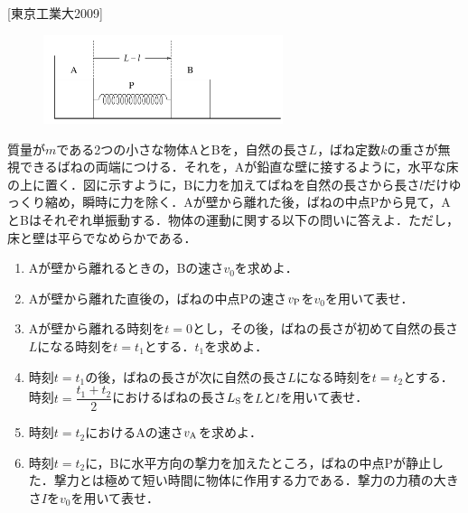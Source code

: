 

\noindent
{} [東京工業大2009]

\begin{figure}
  \centering
  \includegraphics[width=7cm]{fig/fig_1_10.pdf}
\end{figure}
質量が$m$である2つの小さな物体AとBを，自然の長さ$L$，ばね定数$k$の重さが無視できるばねの両端につける．それを，Aが鉛直な壁に接するように，水平な床の上に置く．図に示すように，Bに力を加えてばねを自然の長さから長さ$l$だけゆっくり縮め，瞬時に力を除く．Aが壁から離れた後，ばねの中点Pから見て，AとBはそれぞれ単振動する．物体の運動に関する以下の問いに答えよ．ただし，床と壁は平らでなめらかである．
\begin{enumerate}[(1)]
  \item {\hzw}Aが壁から離れるときの，Bの速さ$v_0$を求めよ．
  \item {\hzw}Aが壁から離れた直後の，ばねの中点Pの速さ$v_\mathrm{P}$を$v_0$を用いて表せ．
  \item {\hzw}Aが壁から離れる時刻を$t = 0$とし，その後，ばねの長さが初めて自然の長さ$L$になる時刻を$t = t_1$とする．$t_1$を求めよ．
  \item {\hzw}時刻$t = t_1$の後，ばねの長さが次に自然の長さ$L$になる時刻を$t = t_2$とする．時刻$t = \dfrac{t_1 + t_2}{2}$におけるばねの長さ$L_\mathrm{S}$を$L$と$l$を用いて表せ．
  \item {\hzw}時刻$t=t_2$におけるAの速さ$v_\mathrm{A}$を求めよ．
  \item {\hzw}時刻$t = t_2$に，Bに水平方向の撃力を加えたところ，ばねの中点Pが静止した．撃力とは極めて短い時間に物体に作用する力である．撃力の力積の大きさ$I$を$v_0$を用いて表せ．
\end{enumerate}
